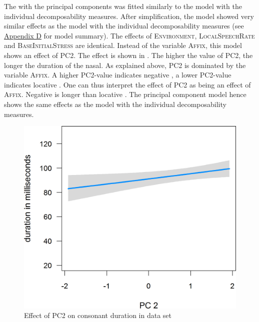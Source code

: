 The  with the principal components was fitted similarly to the model with the individual decomposability measures. After simplification, the model showed very similar effects as the model with the individual decomposability measures (see \hyperref[Appendix D: model summaries corpus]{Appendix D} for model summary). The effects of \textsc{Environment}, \textsc{LocalSpeechRate} and \textsc{BaseInitialStress} are identical. Instead of the variable \textsc{Affix}, this model shows an effect of \textsc{PC2}. The effect is shown in . The higher the value of \textsc{PC2}, the longer the duration of the nasal. As explained above, \textsc{PC2} is dominated by the variable \textsc{Affix}. A higher \textsc{PC2}-value indicates negative , a lower \textsc{PC2}-value indicates locative . One can thus interpret the effect of \textsc{PC2} as being an effect of \textsc{Affix}. Negative  is longer than locative . The principal component model hence shows the same effects as the model with the individual decomposability measures.


\begin{figure}
	
	\includegraphics [scale=0.4] {images/Corpus/imPCAbsPC2.png}
	\caption{Effect of PC2 on consonant duration in data set}
	\label{fig:PC2 in Corpus}
\end{figure}




